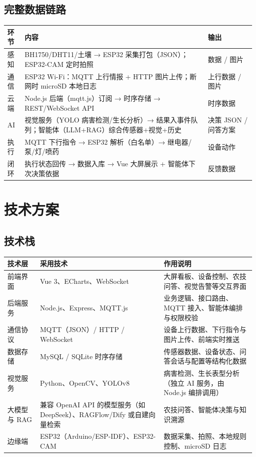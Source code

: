 ﻿\documentclass[11pt]{ctexart}
\begin{document}
\subsection{完整数据链路}
\begin{longtable}{p{1.5cm}p{11.0cm}p{2.6cm}}
  \toprule
  环节 & 内容 & 输出 \\
  \midrule
  感知 & BH1750/DHT11/土壤 → ESP32 采集打包（JSON）；ESP32-CAM 定时拍照 & 数据 / 图片 \\
  通信 & ESP32 Wi-Fi：MQTT 上行情报 + HTTP 图片上传；断网时 microSD 本地日志 & 上行数据 / 图片 \\
  云端 & Node.js 后端（mqtt.js）订阅 → 时序存储 → REST/WebSocket API & 时序数据 \\
  AI & 视觉服务（YOLO 病害检测/生长分析）→ 结果入事件队列；智能体（LLM+RAG）综合传感器+视觉+历史 & 决策 JSON / 问答方案 \\
  执行 & MQTT 下行指令 → ESP32 解析（白名单）→ 继电器/泵/灯/喷药 & 设备动作 \\
  闭环 & 执行状态回传 → 数据入库 → Vue 大屏展示 + 智能体下次决策依据 & 反馈数据 \\
  \bottomrule
\end{longtable}

\section{技术方案}
\subsection{技术栈}
\begin{longtable}{p{2.4cm}p{4.8cm}p{7.6cm}}
  \toprule
  技术层 & 采用技术 & 作用说明 \\
  \midrule
  前端界面 & Vue 3、ECharts、WebSocket & 大屏看板、设备控制、农技问答、视觉告警等交互界面 \\
  后端服务 & Node.js、Express、MQTT.js & 业务逻辑、接口路由、MQTT 接入、智能体编排与权限校验 \\
  通信协议 & MQTT（JSON）/ HTTP / WebSocket & 设备上行数据、下行指令与图片上传、前端实时推送 \\
  数据存储 & MySQL / SQLite 时序存储 & 传感器数据、设备状态、问答会话与配置等结构化数据 \\
  视觉服务 & Python、OpenCV、YOLOv8 & 病害检测、生长表型分析（独立 AI 服务，由 Node.js 编排调用） \\
  大模型与 RAG & 兼容 OpenAI API 的模型服务（如 DeepSeek）、RAGFlow/Dify 或自建向量检索 & 农技问答、智能体决策与知识溯源 \\
  边缘端 & ESP32（Arduino/ESP-IDF）、ESP32-CAM & 数据采集、拍照、本地规则控制、microSD 日志 \\
  \bottomrule
\end{longtable}
\end{document}
